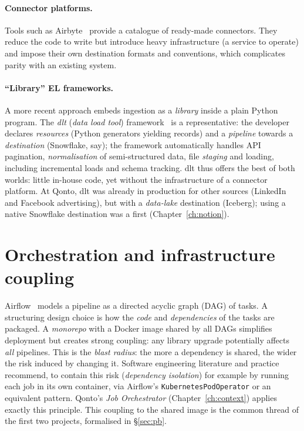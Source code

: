 \paragraph{Connector platforms.} Tools such as Airbyte~\cite{airbyte} provide a catalogue of ready-made connectors. They reduce the code to write but introduce heavy infrastructure (a service to operate) and impose their own destination formats and conventions, which complicates parity with an existing system.

\paragraph{``Library'' EL frameworks.} A more recent approach embeds ingestion as a \emph{library} inside a plain Python program. The \emph{dlt} (\emph{data load tool}) framework~\cite{dlt-docs} is a representative: the developer declares \emph{resources} (Python generators yielding records) and a \emph{pipeline} towards a \emph{destination} (Snowflake, say); the framework automatically handles API pagination, \emph{normalisation} of semi-structured data, file \emph{staging} and loading, including incremental loads and schema tracking. dlt thus offers the best of both worlds: little in-house code, yet without the infrastructure of a connector platform. At Qonto, dlt was already in production for other sources (LinkedIn and Facebook advertising), but with a \emph{data-lake} destination (Iceberg); using a native Snowflake destination was a first (Chapter~\ref{ch:notion}).

\section{Orchestration and infrastructure coupling}

Airflow~\cite{airflow-docs} models a pipeline as a directed acyclic graph (DAG) of tasks. A structuring design choice is how the \emph{code} and \emph{dependencies} of the tasks are packaged. A \emph{monorepo} with a Docker image shared by all DAGs simplifies deployment but creates strong coupling: any library upgrade potentially affects \emph{all} pipelines. This is the \emph{blast radius}: the more a dependency is shared, the wider the risk induced by changing it. Software engineering literature and practice recommend, to contain this risk (\emph{dependency isolation}) for example by running each job in its own container, via Airflow's \texttt{KubernetesPodOperator} or an equivalent pattern. Qonto's \emph{Job Orchestrator} (Chapter~\ref{ch:context}) applies exactly this principle. This coupling to the shared image is the common thread of the first two projects, formalised in \S\ref{sec:pb}.

